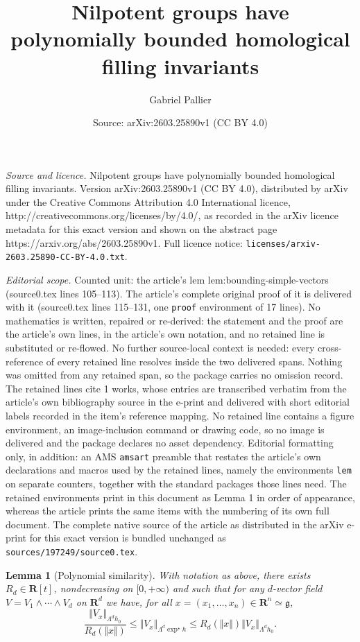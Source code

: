 \documentclass[10pt,a4paper]{amsart}
\title{Nilpotent groups have polynomially bounded homological filling invariants}
\author{Gabriel Pallier}
\date{Source: arXiv:2603.25890v1 (CC BY 4.0)}
\newtheorem{lem}{Lemma}
\begin{document}
\maketitle

\noindent\emph{Source and licence.} Nilpotent groups have polynomially bounded homological filling invariants. Version arXiv:2603.25890v1 (CC BY 4.0), distributed by arXiv under the Creative Commons Attribution 4.0 International licence, http://creativecommons.org/licenses/by/4.0/, as recorded in the arXiv licence metadata for this exact version and shown on the abstract page https://arxiv.org/abs/2603.25890v1. Full licence notice: \texttt{licenses/arxiv-2603.25890-CC-BY-4.0.txt}.\par\smallskip

\noindent\textit{Editorial scope.} Counted unit: the article's lem lem:bounding-simple-vectors (source0.tex lines 105--113). The article's complete original proof of it is delivered with it (source0.tex lines 115--131, one \texttt{proof} environment of 17 lines). No mathematics is written, repaired or re-derived: the statement and the proof are the article's own lines, in the article's own notation, and no retained line is substituted or re-flowed.  No further source-local context is needed: every cross-reference of every retained line resolves inside the two delivered spans.  Nothing was omitted from any retained span, so the package carries no omission record.  The retained lines cite 1 works, whose entries are transcribed verbatim from the article's own bibliography source in the e-print and delivered with short editorial labels recorded in the item's reference mapping.  No retained line contains a figure environment, an image-inclusion command or drawing code, so no image is delivered and the package declares no asset dependency.  Editorial formatting only, in addition: an AMS \texttt{amsart} preamble that restates the article's own declarations and macros used by the retained lines, namely the environments \texttt{lem} on separate counters, together with the standard packages those lines need.  The retained environments print in this document as Lemma 1 in order of appearance, whereas the article prints the same items with the numbering of its own full document.  The complete native source of the article as distributed in the arXiv e-print for this exact version is bundled unchanged as \texttt{sources/197249/source0.tex}.
\begin{lem}[Polynomial similarity]
\label{lem:bounding-simple-vectors}
With notation as above, there exists $R_d\in \mathbf R[t]$, nondecreasing on $[0,+\infty)$ and such that for any $d$-vector field $V = V_1 \wedge \cdots \wedge V_d$ on $\mathbf R^d$ we have, for all $x = (x_1,\ldots, x_n) \in \mathbf R^n \simeq \mathfrak g$,
\begin{equation}
\label{eq:bounding-simple-vectors}
\frac{\Vert V_{x} \Vert_{\Lambda^dh_0}}{R_d (\Vert x \Vert)}
    \leqslant \Vert  V_{x} \Vert_{\Lambda^d \exp^\star h} \leqslant R_d (\Vert x \Vert) \Vert  V_{x} \Vert_{\Lambda^d h_0}.
\end{equation}    
\end{lem}
\end{document}
